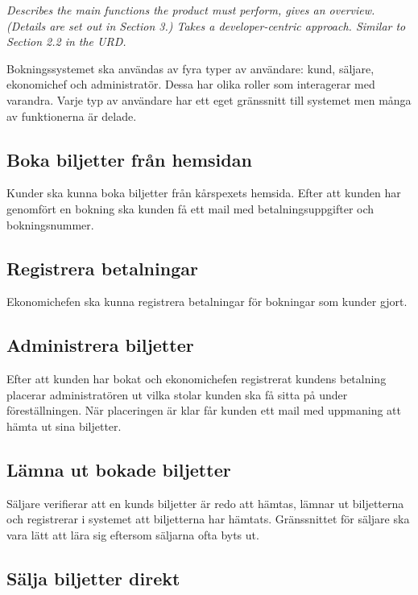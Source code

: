 \documentclass[a4paper, twoside, 11pt, titlepage]{article}
\begin{document}
\emph{Describes the main functions the product must perform, gives an overview. (Details are set out in Section 3.) Takes a developer-centric approach. Similar to Section 2.2 in the URD.}

Bokningssystemet ska användas av fyra typer av användare: kund, säljare, ekonomichef och administratör. Dessa har olika roller som interagerar med varandra. Varje typ av användare har ett eget gränssnitt till systemet men många av funktionerna är delade.

	\subsection{Boka biljetter från hemsidan}


	Kunder ska kunna boka biljetter från kårspexets hemsida. Efter att kunden har genomfört en bokning ska kunden få ett mail med betalningsuppgifter och bokningsnummer.

	\subsection{Registrera betalningar}


	Ekonomichefen ska kunna registrera betalningar för bokningar som kunder gjort.

	\subsection{Administrera biljetter}


	Efter att kunden har bokat och ekonomichefen registrerat kundens betalning placerar administratören ut vilka stolar kunden ska få sitta på under föreställningen. När placeringen är klar får kunden ett mail med uppmaning att hämta ut sina biljetter.

	\subsection{Lämna ut bokade biljetter}


	Säljare verifierar att en kunds biljetter är redo att hämtas, lämnar ut biljetterna och registrerar i systemet att biljetterna har hämtats. Gränssnittet för säljare ska vara lätt att lära sig eftersom säljarna ofta byts ut.

	\subsection{Sälja biljetter direkt}
\end{document}

